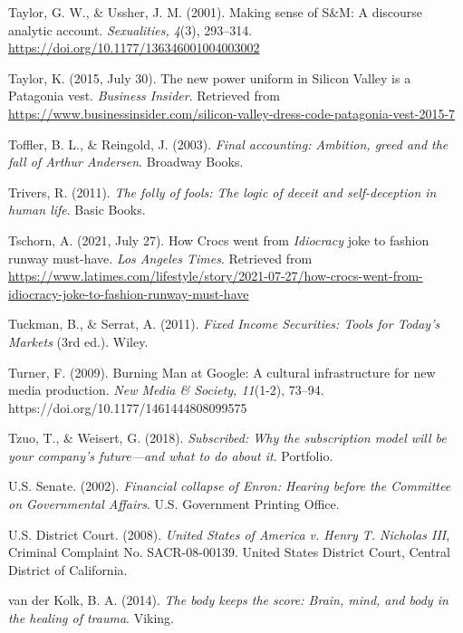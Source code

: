 \begin{thebibliography}{}
    Taylor, G. W., \& Ussher, J. M. (2001). Making sense of S\&M: A discourse analytic account. \textit{Sexualities, 4}(3), 293--314. \url{https://doi.org/10.1177/136346001004003002}

    Taylor, K. (2015, July 30). The new power uniform in Silicon Valley is a Patagonia vest. \textit{Business Insider}. Retrieved from \url{https://www.businessinsider.com/silicon-valley-dress-code-patagonia-vest-2015-7}

    Toffler, B. L., \& Reingold, J. (2003). \textit{Final accounting: Ambition, greed and the fall of Arthur Andersen}. Broadway Books.

    Trivers, R. (2011). \textit{The folly of fools: The logic of deceit and self-deception in human life}. Basic Books.

    Tschorn, A. (2021, July 27). How Crocs went from \textit{Idiocracy} joke to fashion runway must-have. \textit{Los Angeles Times}. Retrieved from \url{https://www.latimes.com/lifestyle/story/2021-07-27/how-crocs-went-from-idiocracy-joke-to-fashion-runway-must-have}

    Tuckman, B., \& Serrat, A. (2011). \textit{Fixed Income Securities: Tools for Today's Markets} (3rd ed.). Wiley.

    Turner, F. (2009). Burning Man at Google: A cultural infrastructure for new media production. \textit{New Media \& Society, 11}(1-2), 73–94. https://doi.org/10.1177/1461444808099575

    Tzuo, T., \& Weisert, G. (2018). \textit{Subscribed: Why the subscription model will be your company's future—and what to do about it}. Portfolio.


    U.S. Senate. (2002). \textit{Financial collapse of Enron: Hearing before the Committee on Governmental Affairs}. U.S. Government Printing Office.

    U.S. District Court. (2008). \textit{United States of America v. Henry T. Nicholas III}, Criminal Complaint No. SACR-08-00139. United States District Court, Central District of California.


    van der Kolk, B. A. (2014). \textit{The body keeps the score: Brain, mind, and body in the healing of trauma}. Viking.


\end{thebibliography}
